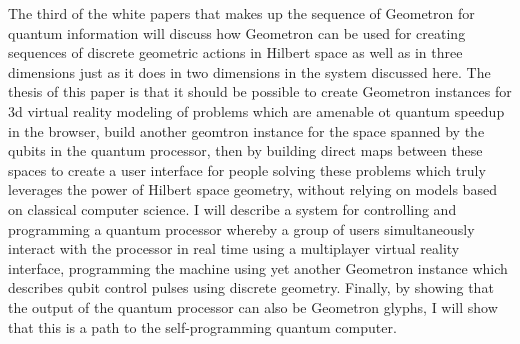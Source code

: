 \documentclass[11pt]{article}
\begin{document}
The third of the white papers that makes up the sequence of Geometron for quantum information will discuss how Geometron can be used for creating sequences of discrete geometric actions in Hilbert space as well as in three dimensions just as it does in two dimensions in the system discussed here.  The thesis of this paper is that it should be possible to create Geometron instances for 3d virtual reality modeling of problems which are amenable ot quantum speedup in the browser, build another geomtron instance for the space spanned by the qubits in the quantum processor, then by building direct maps between these spaces to create a user interface for people solving these problems which truly leverages the power of Hilbert space geometry, without relying on models based on classical computer science.   I will describe a system for controlling and programming a quantum processor whereby a group of users simultaneously interact with the processor in real time using a multiplayer virtual reality interface, programming the machine using yet another Geometron instance which describes qubit control pulses using discrete geometry.  Finally, by showing that the output of the quantum processor can also be Geometron glyphs, I will show that this is a path to the self-programming quantum computer.
\end{document}
